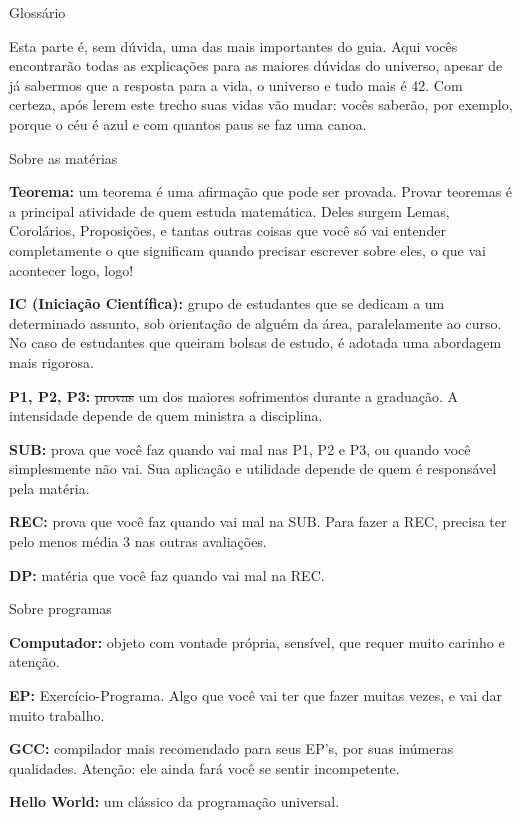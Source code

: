 \begin{secao}{Glossário}

Esta parte é, sem dúvida, uma das mais importantes do guia. Aqui vocês
encontrarão todas as explicações para as maiores dúvidas do universo, apesar de
já sabermos que a resposta para a vida, o universo e tudo mais é 42. Com
certeza, após lerem este trecho suas vidas vão mudar: vocês saberão, por exemplo,
porque o céu é azul e com quantos paus se faz uma canoa.

\begin{subsecao}{Sobre as matérias}

{\bf Teorema:} um teorema é uma afirmação que pode ser provada. Provar
teoremas é a principal atividade de quem estuda matemática. Deles surgem Lemas,
Corolários, Proposições, e tantas outras coisas que você só vai entender
completamente o que significam quando precisar escrever sobre eles, o que vai
acontecer logo, logo!

{\bf IC (Iniciação Científica):} grupo de estudantes que se dedicam a um
determinado assunto, sob orientação de alguém da área, paralelamente ao curso.
No caso de estudantes que queiram bolsas de estudo, é adotada uma abordagem
mais rigorosa.

{\bf P1, P2, P3:} \sout{provas} um dos maiores sofrimentos durante a graduação.
A intensidade depende de quem ministra a disciplina.

{\bf SUB:} prova que você faz quando vai mal nas P1, P2 e P3, ou quando você
simplesmente não vai. Sua aplicação e utilidade depende de quem é responsável
pela matéria.

{\bf REC:} prova que você faz quando vai mal na SUB. Para fazer a REC, precisa
ter pelo menos média 3 nas outras avaliações.

{\bf DP:} matéria que você faz quando vai mal na REC.
\end{subsecao}

\begin{subsecao}{Sobre programas}

{\bf Computador:} objeto com vontade própria, sensível, que requer muito
carinho e atenção.

{\bf EP:} Exercício-Programa. Algo que você vai ter que fazer muitas vezes, e
vai dar muito trabalho.

{\bf GCC:} compilador mais recomendado para seus EP's, por suas inúmeras
qualidades. Atenção: ele ainda fará você se sentir incompetente.

{\bf Hello World:} um clássico da programação universal.


\end{subsecao}
\end{secao}
